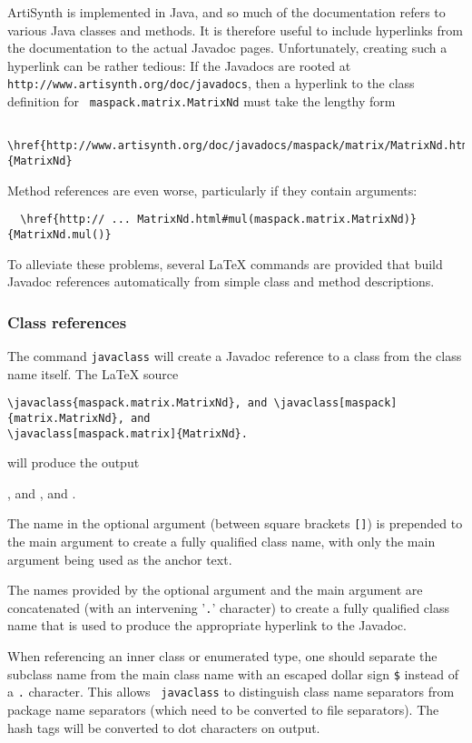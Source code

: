 \documentclass{article}
\begin{document}
ArtiSynth is implemented in Java, and so much of the documentation
refers to various Java classes and methods. It is therefore useful to
include hyperlinks from the documentation to the actual Javadoc pages.
Unfortunately, creating such a hyperlink can be rather tedious: If the
Javadocs are rooted at {\tt http://www.artisynth.org/doc/javadocs},
then a hyperlink to the class definition for {\tt
maspack.matrix.MatrixNd} must take the lengthy form
\begin{verbatim}
  \href{http://www.artisynth.org/doc/javadocs/maspack/matrix/MatrixNd.html}{MatrixNd}
\end{verbatim}
Method references are even worse, particularly if they contain arguments:
\begin{verbatim}
  \href{http:// ... MatrixNd.html#mul(maspack.matrix.MatrixNd)}{MatrixNd.mul()}
\end{verbatim}
To alleviate these problems, several LaTeX commands are provided that
build Javadoc references automatically from simple class and
method descriptions.

\subsubsection{Class references}
\label{ClassRefsSec}

The command {\tt \BKS javaclass} will create a Javadoc reference to 
a class from the class name itself. The LaTeX source

\begin{lstlisting}[]
\javaclass{maspack.matrix.MatrixNd}, and \javaclass[maspack]{matrix.MatrixNd}, and
\javaclass[maspack.matrix]{MatrixNd}.
\end{lstlisting}

will produce the output

, and , and
.

The name in the optional argument (between square brackets {\tt []})
is prepended to the main argument to create a fully qualified class name,
with only the main argument being used as the anchor text. 

The names provided by the optional argument and the main argument are
concatenated (with an intervening '{\tt .}' character) to create a
fully qualified class name that is used to produce the appropriate
hyperlink to the Javadoc. 

When referencing an inner class or enumerated type, one should
separate the subclass name from the main class name with an escaped
dollar sign {\tt \$} instead of a {\tt .} character. This allows {\tt \BKS
javaclass} to distinguish class name separators from package name
separators (which need to be converted to file separators). The
hash tags will be converted to dot characters on output.
\end{document}

